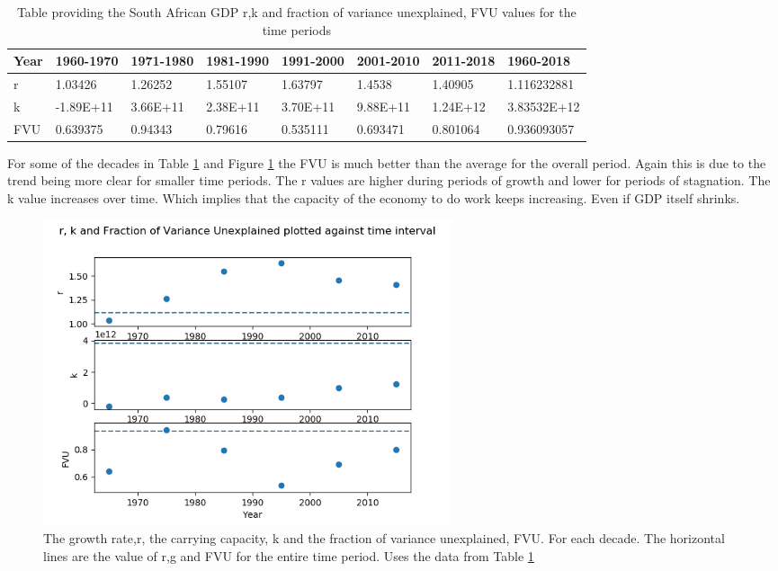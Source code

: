 \documentclass[11pt,a4paper]{CLabBookTemplate} %
\begin{document}
\begin{table}[]
	\begin{tabular}{|l|l|l|l|l|l|l|l|}
		\hline
		Year & 1960-1970 & 1971-1980 & 1981-1990 & 1991-2000 & 2001-2010 & 2011-2018 & 1960-2018   \\ \hline
		r    & 1.03426   & 1.26252   & 1.55107   & 1.63797   & 1.4538    & 1.40905   & 1.116232881 \\ \hline
		k    & -1.89E+11 & 3.66E+11  & 2.38E+11  & 3.70E+11  & 9.88E+11  & 1.24E+12  & 3.83532E+12 \\ \hline
		FVU  & 0.639375  & 0.94343   & 0.79616   & 0.535111  & 0.693471  & 0.801064  & 0.936093057 \\ \hline
	\end{tabular}
	\caption{Table providing the South African GDP r,k and fraction of variance unexplained, FVU values for the time periods}
	\label{RSATable}
\end{table}
For some of the decades in Table \ref{RSATable} and Figure \ref{fig:RgkRSA} the FVU is much better than the average for the overall period. Again this is due to the trend being more clear for smaller time periods. The r values are higher during periods of growth and lower for periods of stagnation. The k value increases over time. Which implies that the capacity of the economy to do work keeps increasing. Even if GDP itself shrinks. 
\begin{figure}[h!]
	\centering
	\includegraphics[width = 120mm]{Figures/RgkRSA.png}
	\caption{The growth rate,r, the carrying capacity, k and the fraction of variance unexplained, FVU. For each decade. The horizontal lines are the value of r,g and FVU for the entire time period. Uses the data from Table \ref{RSATable}}
	\label{fig:RgkRSA}
\end{figure}
\clearpage
\end{document}
